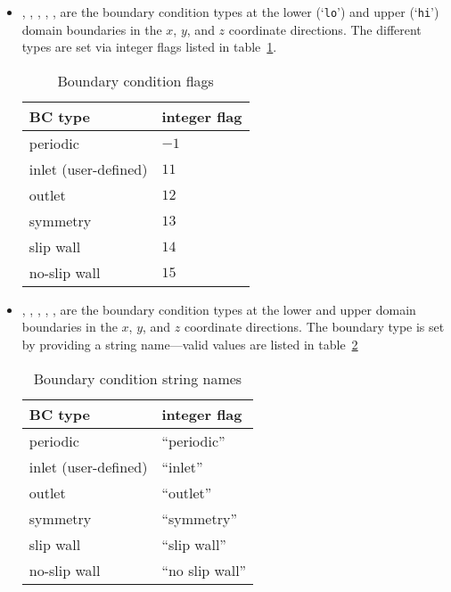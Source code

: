 \begin{itemize}
   \begin{itemize}

   \item {}, , , , ,  are the
      boundary condition types at the lower (`{\tt lo}') and upper
      (`{\tt hi}') domain boundaries in the $x$, $y$, and $z$
      coordinate directions.  The different types are set via integer
      flags listed in table~\ref{gs:table:bcflags}.

   \begin{table}[h]
   \caption{\label{gs:table:bcflags} Boundary condition flags}  
   \begin{center}
   \begin{tabular}{ll}
   \hline
   BC type    & integer flag \\
   \hline
   periodic             & $-1$ \\
   inlet (user-defined) & $11$ \\
   outlet               & $12$ \\
   symmetry             & $13$ \\
   slip wall            & $14$ \\
   no-slip wall         & $15$ \\
   \hline
   \end{tabular}
   \end{center}
   \end{table}

   \item {}, , , , , 
   are the boundary condition types at the lower and upper domain
   boundaries in the $x$, $y$, and $z$ coordinate directions.  The
   boundary type is set by providing a string name---valid values are
   listed in table~\ref{gs:table:bcstrings}

   \begin{table}[h]
   \caption{\label{gs:table:bcstrings} Boundary condition string names}  
   \begin{center}
   \begin{tabular}{ll}
   \hline
   BC type    & integer flag \\
   \hline
   periodic             & ``periodic'' \\
   inlet (user-defined) & ``inlet'' \\
   outlet               & ``outlet'' \\
   symmetry             & ``symmetry'' \\
   slip wall            & ``slip wall'' \\
   no-slip wall         & ``no slip wall'' \\
   \hline
   \end{tabular}
   \end{center}
   \end{table}


\end{itemize}
\end{itemize}
